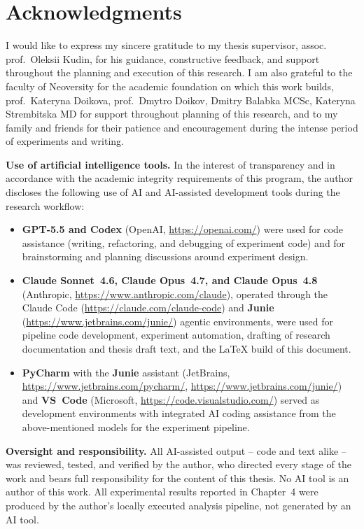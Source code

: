 \chapter*{Acknowledgments}
I would like to express my sincere gratitude to my thesis supervisor, assoc. prof.~Oleksii Kudin, for his guidance, constructive feedback, and support throughout the planning and execution of this research. I am also grateful to the faculty of Neoversity for the academic foundation on which this work builds, prof.~Kateryna Doikova, prof.~Dmytro Doikov, Dmitry Balabka MCSc, Kateryna Strembitska MD for support throughout planning of this research, and to my family and friends for their patience and encouragement during the intense period of experiments and writing.

\vspace{0.4cm}
\noindent\textbf{Use of artificial intelligence tools.} In the interest of transparency and in accordance with the academic integrity requirements of this program, the author discloses the following use of AI and AI-assisted development tools during the research workflow:

\begin{itemize}
  \item \textbf{GPT-5.5 and Codex} (OpenAI, \url{https://openai.com/}) were used for code assistance (writing, refactoring, and debugging of experiment code) and for brainstorming and planning discussions around experiment design.
  \item \textbf{Claude Sonnet~4.6, Claude Opus~4.7, and Claude Opus~4.8} (Anthropic, \url{https://www.anthropic.com/claude}), operated through the Claude Code (\url{https://claude.com/claude-code}) and \textbf{Junie} (\url{https://www.jetbrains.com/junie/}) agentic environments, were used for pipeline code development, experiment automation, drafting of research documentation and thesis draft text, and the \LaTeX{} build of this document.
  \item \textbf{PyCharm} with the \textbf{Junie} assistant (JetBrains, \url{https://www.jetbrains.com/pycharm/}, \url{https://www.jetbrains.com/junie/}) and \textbf{VS~Code} (Microsoft, \url{https://code.visualstudio.com/}) served as development environments with integrated AI coding assistance from the above-mentioned models for the experiment pipeline.
\end{itemize}

\noindent\textbf{Oversight and responsibility.} All AI-assisted output -- code and text alike -- was reviewed, tested, and verified by the author, who directed every stage of the work and bears full responsibility for the content of this thesis. No AI tool is an author of this work. All experimental results reported in Chapter~4 were produced by the author's locally executed analysis pipeline, not generated by an AI tool.


